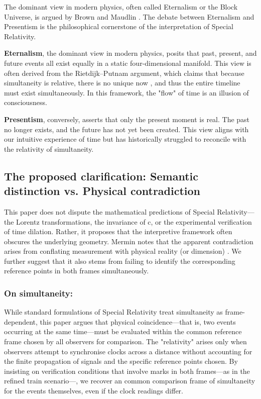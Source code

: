 \documentclass[pdflatex,sn-basic]{sn-jnl}
\theoremstyle{thmstyleone}%
\theoremstyle{thmstyletwo}%
\theoremstyle{thmstylethree}%
\begin{document}
The dominant view in modern physics, often called Eternalism or the Block Universe, is argued by Brown \cite{brown2005} and Maudlin \cite{maudlin2012}. The debate between Eternalism and Presentism is the philosophical cornerstone of the interpretation of Special Relativity. 

		\textbf{Eternalism}, the dominant view in modern physics, posits that past, present, and future events all exist equally in a static four-dimensional manifold. This view is often derived from the Rietdijk–Putnam argument, which claims that because simultaneity is relative, there is no unique now \cite{rietdijk1966, putnam1967}, and thus the entire timeline must exist simultaneously. In this framework, the "flow" of time is an illusion of consciousness.

		\textbf{Presentism}, conversely, asserts that only the present moment is real. The past no longer exists, and the future has not yet been created. This view aligns with our intuitive experience of time but has historically struggled to reconcile with the relativity of simultaneity.
	\subsection{The proposed clarification: Semantic distinction vs. Physical contradiction}\label{subsec5_2}
	This paper does not dispute the mathematical predictions of Special Relativity—the Lorentz transformations, the invariance of c, or the experimental verification of time dilation. Rather, it proposes that the interpretive framework often obscures the underlying geometry. Mermin notes that the apparent contradiction arises from conflating measurement with physical reality (or dimension) \cite{mermin1984}. We further suggest that it also stems from failing to identify the corresponding reference points in both frames simultaneously.
	\subsubsection{On simultaneity:}\label{subsubsec5_2_1}
While standard formulations of Special Relativity treat simultaneity as frame-dependent, this paper argues that physical coincidence—that is, two events occurring at the same time—must be evaluated within the common reference frame chosen by all observers for comparison. The "relativity" arises only when observers attempt to synchronise clocks across a distance without accounting for the finite propagation of signals and the specific reference points chosen. By insisting on verification conditions that involve marks in both frames—as in the refined train scenario—, we recover an common comparison frame of simultaneity for the events themselves, even if the clock readings differ.
\end{document}
